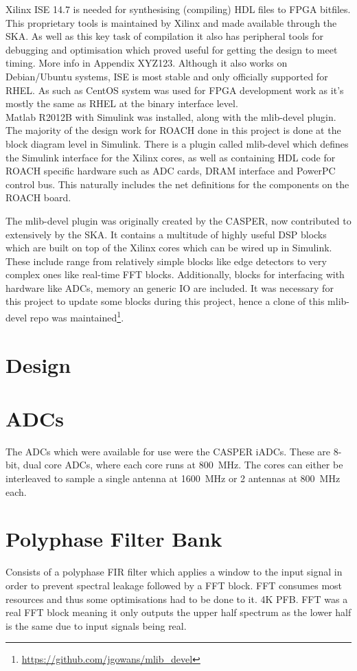 Xilinx ISE 14.7 is needed for synthesising (compiling) HDL files to FPGA bitfiles. This proprietary tools is maintained by Xilinx and made available through the SKA. As well as this key task of compilation it also has peripheral tools for debugging and optimisation which proved useful for getting the design to meet timing. More info in Appendix XYZ123. Although it also works on Debian/Ubuntu systems, ISE is most stable and only officially supported for RHEL. As such as CentOS system was used for FPGA development work as it's mostly the same as RHEL at the binary interface level.\\

Matlab R2012B with Simulink was installed, along  with the mlib-devel plugin. The majority of the design work for ROACH done in this project is done at the block diagram level in Simulink. There is a plugin called mlib-devel which defines the Simulink interface for the Xilinx cores, as well as containing HDL code for ROACH specific hardware such as ADC cards, DRAM interface and PowerPC control bus. This naturally includes the net definitions for the components on the ROACH board.

The mlib-devel plugin was originally created by the CASPER, now contributed to extensively by the SKA. It contains a multitude of highly useful DSP blocks which are built on top of the Xilinx cores which can be wired up in Simulink. These include range from relatively simple blocks like edge detectors to very complex ones like real-time FFT blocks. Additionally, blocks for interfacing with hardware like ADCs, memory an generic IO are included. It was necessary for this project to update some blocks during this project, hence a clone of this mlib-devel repo was maintained\footnote{\url{https://github.com/jgowans/mlib_devel}}.

\section{Design}


\section{ADCs}
The ADCs which were available for use were the CASPER iADCs. 
These are 8-bit, dual core ADCs, where each core runs at \SI{800}{\mega\hertz}. The cores can either be interleaved to sample a single antenna at \SI{1600}{\mega\hertz} or 2 antennas at \SI{800}{\mega\hertz} each.

\section{Polyphase Filter Bank}
Consists of a polyphase FIR filter which applies a window to the input signal in order to prevent spectral leakage followed by a FFT block. FFT consumes most resources and thus some optimisations had to be done to it. 4K PFB. FFT was a real FFT block meaning it only outputs the upper half spectrum as the lower half is the same due to input signals being real. 


